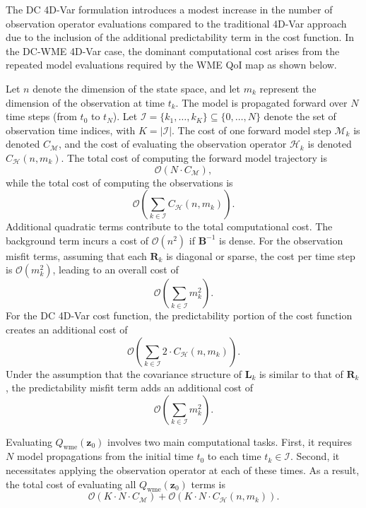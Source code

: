 \documentclass[final,1p,times]{elsarticle}
\begin{document}
 

The DC 4D-Var formulation introduces a modest increase in the number of observation operator evaluations compared to the traditional 4D-Var approach due to the inclusion of the additional predictability term in the cost function. 
In the DC-WME 4D-Var case, the dominant computational cost arises from the repeated model evaluations required by the WME QoI map as shown below.

Let $n$ denote the dimension of the state space, and let $m_k$ represent the dimension of the observation at time $t_k$. The model is propagated forward over $N$ time steps (from $t_0$ to $t_N$). 
Let $\mathcal{I} = \{k_1, \ldots, k_K\} \subseteq \{0, \ldots, N\}$ denote the set of observation time indices, with $K = |\mathcal{I}|$. 
The cost of one forward model step $\mathcal{M}_k$ is denoted $C_\mathcal{M}$, and the cost of evaluating the observation operator $\mathcal{H}_k$ is denoted $C_\mathcal{H}(n, m_k)$. The total cost of computing the forward model trajectory is 
\[
\mathcal{O}(N \cdot C_\mathcal{M}),
\]
while the total cost of computing the observations is
\[
\mathcal{O}\left( \sum_{k \in \mathcal{I}} C_\mathcal{H}(n, m_k) \right).
\]
Additional quadratic terms contribute to the total computational cost. 
The background term incurs a cost of $\mathcal{O}(n^2)$ if $\mathbf{B}^{-1}$ is dense. 
For the observation misfit terms, assuming that each $\mathbf{R}_k$ is diagonal or sparse, the cost per time step is $\mathcal{O}(m_k^2)$, leading to an overall cost of
\[
    \mathcal{O}\left( \sum_{k \in \mathcal{I}} m_k^2 \right).
\]
For the DC 4D-Var cost function, the predictability portion of the cost function creates an additional cost of
\[
    \mathcal{O}\left( \sum_{k \in \mathcal{I}} 2 \cdot C_{\mathcal{H}}(n, m_k) \right).
\]
Under the assumption that the covariance structure of $\mathbf{L}_k$ is similar to that of $\mathbf{R}_k$, the predictability misfit term adds an additional cost of
\[
    \mathcal{O}\left( \sum_{k \in \mathcal{I}} m_k^2 \right).
\]

Evaluating $Q_{\mathrm{wme}}(\mathbf{z}_0)$ involves two main computational tasks. 
First, it requires $N$ model propagations from the initial time $t_0$ to each time $t_k \in \mathcal{I}$. 
Second, it necessitates applying the observation operator at each of these times. 
As a result, the total cost of evaluating all $Q_{\mathrm{wme}}(\mathbf{z}_0)$ terms is
\[
    \mathcal{O}\left( K \cdot N \cdot C_{\mathcal{M}} \right) + \mathcal{O}\left( K \cdot N \cdot C_{\mathcal{H}}(n, m_k) \right).
\]
\end{document}
